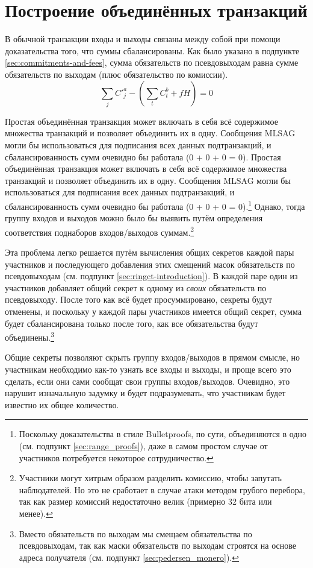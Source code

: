 \section{Построение объединённых транзакций}
\label{sec:building-txtangle}

В обычной транзакции входы и выходы связаны между собой при помощи доказательства того, что суммы сбалансированы. Как было указано в подпункте \ref{sec:commitments-and-fees}, сумма обязательств по псевдовыходам равна сумме обязательств по выходам (плюс обязательство по комиссии).
\[\sum_j C'^a_{j} - (\sum_t C^b_{t} + f H) = 0\]

Простая объединённая транзакция может включать в себя всё содержимое множества транзак\-ций и позволяет объединить их в одну. Сообщения MLSAG могли бы использоваться для подписания всех данных подтранзакций, и сбалансированность сумм очевидно бы работала (0 + 0 + 0 = 0). Простая объединённая транзакция может включать в себя всё содержимое множества транзакций и позволяет объединить их в одну. Сообщения MLSAG могли бы использоваться для подписания всех данных подтранзакций, и сбалансированность сумм очевидно бы работала (0 + 0 + 0 = 0).\footnote{Поскольку доказательства в стиле Bulletproofs, по сути, объединяются в одно (см. подпункт \ref{sec:range_proofs}), даже в самом простом случае от участников потребуется некоторое сотрудничество.} Однако, тогда группу входов и выходов можно было бы выявить путём определения соответствия поднаборов входов/выходов суммам.\footnote{Участники могут хитрым образом разделить комиссию, чтобы запутать наблюдателей. Но это не сработает в случае атаки методом грубого перебора, так как размер комиссий недостаточно велик (примерно 32 бита или менее).}

Эта проблема легко решается путём вычисления общих секретов каждой пары участников и последующего добавления этих смещений масок обязательств по псевдовыходам (см. под\-пункт \ref{sec:ringct-introduction}). В каждой паре один из участников добавляет общий секрет к одному из {\em своих} обязательств по псевдовыходу. После того как всё будет просуммировано, секреты будут отменены, и поскольку у каждой пары участников имеется общий секрет, сумма будет сбалан\-сирована только после того, как все обязательства будут объединены.\footnote{Вместо обязательств по выходам мы смещаем обязательства по псевдовыходам, так как маски обязательств по выходам строятся на основе адреса получателя (см. подпункт \ref{sec:pedersen_monero}).}

Общие секреты позволяют скрыть группу входов/выходов в прямом смысле, но участникам необходимо как-то узнать все входы и выходы, и проще всего это сделать, если они сами сообщат свои группы входов/выходов. Очевидно, это нарушит изначальную задумку и будет подразумевать, что участникам будет известно их общее количество.


